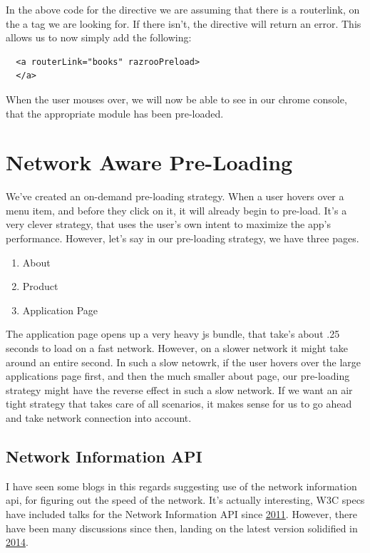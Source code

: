 In the above code for the directive we are assuming that there 
is a routerlink, on the a tag we are looking for. If there isn't, the directive 
will return an error. This allows us to now simply add the following: 
\begin{lstlisting}
  <a routerLink="books" razrooPreload>
  </a> 
\end{lstlisting}

When the user mouses over, we will now be able to see in our chrome console,
that the appropriate module has been pre-loaded. 

\section{ Network Aware Pre-Loading }
We've created an on-demand pre-loading strategy. When a user hovers over a 
menu item, and before they click on it, it will already begin to pre-load. 
It's a very clever strategy, that uses the user's own intent to maximize 
the app's performance. However, let's say in our pre-loading strategy, we 
have three pages. 
\begin{enumerate}
  \item About 
  \item Product
  \item Application Page
\end{enumerate}

The application page opens up a very heavy js bundle, that take's about 
.25 seconds to load on a fast network. However, on a slower network it might 
take around an entire second. In such a slow netowrk, if the user hovers
over the large applications page first, and then the much smaller about page,
our pre-loading strategy might have the reverse effect in such a slow network.
If we want an air tight strategy that takes care of all scenarios, it makes 
sense for us to go ahead and take network connection into account. 

\subsection{Network Information API}
I have seen some blogs in this regards suggesting use of the network
information api, for figuring out the speed of the network. It's actually 
interesting, W3C specs have included talks for the Network Information API 
since \href{https://www.w3.org/TR/2011/WD-netinfo-api-20110607/}{2011}. However, 
there have been many discussions since then, landing on the latest version
solidified in \href{https://www.w3.org/TR/netinfo-api/}{2014}. 

